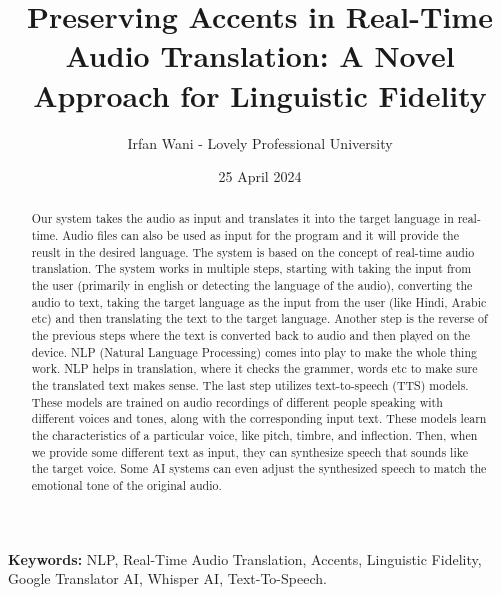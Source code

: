 \documentclass[12px, a4paper]{article}
\title{Preserving Accents in Real-Time Audio Translation: A Novel Approach for Linguistic Fidelity}
\author{Irfan Wani - Lovely Professional University}
\date{25 April 2024}
\begin{document}
    
\maketitle
    \begin{abstract}
    Our system takes the audio as input and translates it into the target language in real-time. Audio files can also be used as input for the program and it will provide the reuslt in the desired language. The system is based on the concept of real-time audio translation. The system works in multiple steps, starting with taking the input from the user (primarily in english or detecting the language of the audio), converting the audio to text, taking the target language as the input from the user (like Hindi, Arabic etc) and then translating the text to the target language. Another step is the reverse of the previous steps where the text is converted back to audio and then played on the device.  NLP (Natural Language Processing) comes into play to make the whole thing work. NLP helps in translation, where it checks the grammer, words etc to make sure the translated text makes sense.
    The last step utilizes text-to-speech (TTS) models. These models are trained on audio recordings of different people speaking with different voices and tones, along with the corresponding input text. These models learn the characteristics of a particular voice, like pitch, timbre, and inflection. Then, when we provide some different text as input, they can synthesize speech that sounds like the target voice. Some AI systems can even adjust the synthesized speech to match the emotional tone of the original audio.
    \end{abstract}
    \textbf{Keywords: } NLP, Real-Time Audio Translation, Accents, Linguistic Fidelity, Google Translator AI, Whisper AI, Text-To-Speech.
\end{document}
